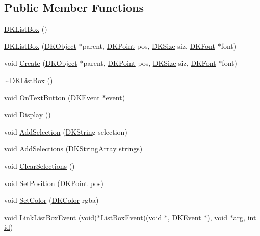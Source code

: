 \subsection*{Public Member Functions}
\begin{DoxyCompactItemize}
\item 
\hyperlink{class_d_k_list_box_a8bb84e66896b2ec9bfc63174bdc8df8d}{D\-K\-List\-Box} ()
\item 
\hyperlink{class_d_k_list_box_ab5c1d1c12c48880721fd51295a147708}{D\-K\-List\-Box} (\hyperlink{class_d_k_object}{D\-K\-Object} $\ast$parent, \hyperlink{_d_k_axis_8h_a0ca1f005fbb936f8e7a7f2433591f418}{D\-K\-Point} pos, \hyperlink{_d_k_axis_8h_aaa25a8c7cbf504fffdb8a4208ff7a731}{D\-K\-Size} siz, \hyperlink{class_d_k_font}{D\-K\-Font} $\ast$font)
\item 
void \hyperlink{class_d_k_list_box_abe1fc4f32085bf2f20165c3d4c67a689}{Create} (\hyperlink{class_d_k_object}{D\-K\-Object} $\ast$parent, \hyperlink{_d_k_axis_8h_a0ca1f005fbb936f8e7a7f2433591f418}{D\-K\-Point} pos, \hyperlink{_d_k_axis_8h_aaa25a8c7cbf504fffdb8a4208ff7a731}{D\-K\-Size} siz, \hyperlink{class_d_k_font}{D\-K\-Font} $\ast$font)
\item 
\hyperlink{class_d_k_list_box_aa2cb0b08d457e648dd611d3dc2d77dc5}{$\sim$\-D\-K\-List\-Box} ()
\item 
void \hyperlink{class_d_k_list_box_ac63823764b57c825508ebd8e9288467e}{On\-Text\-Button} (\hyperlink{class_d_k_event}{D\-K\-Event} $\ast$\hyperlink{class_d_k_event_a3deebb932ed734363c4ece87971bc45f}{event})
\item 
void \hyperlink{class_d_k_list_box_a9a707abcab18a94da2fa024d6c132b05}{Display} ()
\item 
void \hyperlink{class_d_k_list_box_a6593ee4089e5def2a9ea30515fab2c63}{Add\-Selection} (\hyperlink{_d_k_string_8h_ac168e8555ceba18e1a2919b21976bc84}{D\-K\-String} selection)
\item 
void \hyperlink{class_d_k_list_box_a124fb64b9b4261f49384bc88e36f28d7}{Add\-Selections} (\hyperlink{_d_k_string_8h_a7eaad67bd9c10af6a5df95c3d7dd44f8}{D\-K\-String\-Array} strings)
\item 
void \hyperlink{class_d_k_list_box_a21897ffe0a59bcf6c0f23cf3994a6ce7}{Clear\-Selections} ()
\item 
void \hyperlink{class_d_k_list_box_a513086fd2d7f6ddffe895b9cba8a3c3c}{Set\-Position} (\hyperlink{_d_k_axis_8h_a0ca1f005fbb936f8e7a7f2433591f418}{D\-K\-Point} pos)
\item 
void \hyperlink{class_d_k_list_box_a58541f57af036c35c9781e986364334b}{Set\-Color} (\hyperlink{class_d_k_color}{D\-K\-Color} rgba)
\item 
void \hyperlink{class_d_k_list_box_af4a4ab2ae39b17dff6a5d5fba63e33d2}{Link\-List\-Box\-Event} (void($\ast$\hyperlink{class_d_k_event_aea5143b78f3e3ac487f8913ec3af1749}{List\-Box\-Event})(void $\ast$, \hyperlink{class_d_k_event}{D\-K\-Event} $\ast$), void $\ast$arg, int \hyperlink{class_d_k_event_a46877918e12fcb3b2c8988379b6fa6fa}{id})
\end{DoxyCompactItemize}
